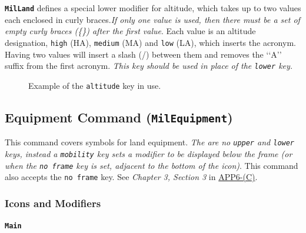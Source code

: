 \documentclass[a4paper, titlepage]{article}
\newcommand\DocLink{\href{https://www.awl.edu.pl/images/en/APP_6_C.pdf}{APP6-(C)}}
\begin{document}
\textbf{\texttt{MilLand}} defines a special lower modifier for altitude, which takes up to two values each enclosed in curly braces.\textit{If only one value is used, then there must be a set of empty curly braces (\{\}) after the first value}. Each value is an altitude designation, \texttt{high} (HA), \texttt{medium} (MA) and \texttt{low} (LA), which inserts the acronym. Having two values will insert a slash (/) between them and removes the \lq\lq{}A\rq\rq{} suffix from the first acronym. \textit{This key should be used in place of the \texttt{lower} key.}

\begin{figure}[H]
\centering
{}
\caption{Example of the \texttt{altitude} key in use.}
\end{figure}

\subsection{Equipment Command (\textbf{\texttt{MilEquipment}})}

This command covers symbols for land equipment. \textit{The are no \texttt{upper} and \texttt{lower} keys, instead a \texttt{mobility} key sets a modifier to be displayed below the frame (or when the \texttt{no frame} key is set, adjacent to the bottom of the icon)}. This command also accepts the \texttt{no frame} key. See \textit{Chapter 3, Section 3} in \DocLink.

\subsubsection{Icons and Modifiers}

\paragraph{\texttt{Main}}\quad
%
\end{document}

